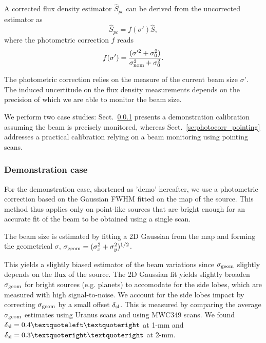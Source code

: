 A corrected flux density estimator $\hat{S}_{pc}$ can be derived from
the uncorrected estimator as
\begin{equation}
  \hat{S}_{pc} = f(\sigma')\hat{S},  
\end{equation} 
where the photometric correction $f$ reads
\begin{equation}
  f(\sigma') = \frac{(\sigma'^2 + \sigma_0^2)}{\sigma_{\rm{nom}}^2 + \sigma_0^2}. 
\end{equation} 

The photometric correction relies on the measure of the current beam
size $\sigma ’$. The induced uncertitude on the flux density
measurements depends on the precision of which we are able to monitor
the beam size. 

We perform two case studies: Sect.~\ref{se:photocorr_demo} presents a demonstration
calibration assuming the beam is precisely monitored, whereas
Sect.~\ref{se:photocorr_pointing} addresses a practical calibration relying
on a beam monitoring using pointing scans. 

\subsubsection{Demonstration case}
\label{se:photocorr_demo}

For the demonstration case, shortened as 'demo' hereafter, we use a
photometric correction based on the Gaussian FWHM fitted on the map
of the source. This method thus applies only on point-like
sources that are bright enough for an accurate fit of the beam to be
obtained using a single scan.  

The beam size is estimated by fitting a 2D Gaussian from the map and
forming the geometrical $\sigma$, $\sigma_{\rm{geom}} = (\sigma_x^2 +
\sigma_y^2)^{1/2}$.  

This yields a slightly biased estimator of the beam variations since
$\sigma_{\rm geom}$ slightly depends on the flux of the source. The 2D
Gaussian fit yields slightly broaden $\sigma_{\rm{geom}}$ for bright
sources (e.g. planets) to accomodate for the side lobes, which are
measured with high signal-to-noise. We account for the side lobes
impact by correcting $\sigma_{\rm{geom}}$ by a small offset
$\delta_{\rm{sl}}$. This is measured by comparing the
average $\sigma_{\rm{geom}}$ estimates using Uranus scans and using
MWC349 scans.
We found $\delta_{\rm{sl}} = 0.4‘’$ at 1-mm and $\delta_{\rm{sl}} =
0.3’’$ at 2-mm. 





